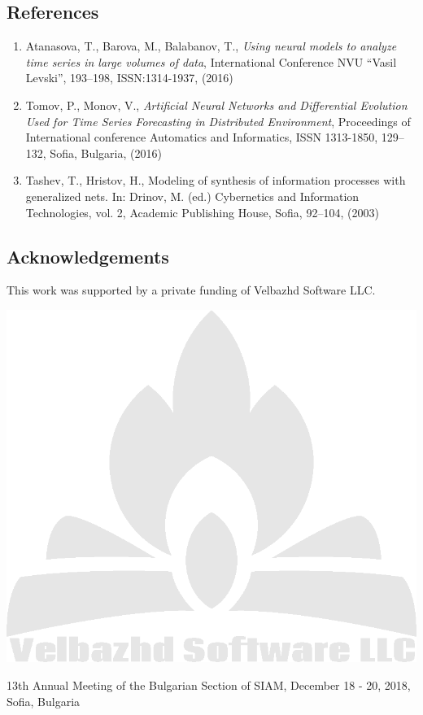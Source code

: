 \documentclass[a0,portrait,25pt]{sciposter}
\begin{document}
\begin{multicols}{3}
\begin{mdframed}[backgroundcolor=white,roundcorner=4pt,shadow=true,linewidth=1pt]
\color{Black}
\section*{References}
\begin{enumerate}
\item Atanasova, T., Barova, M., Balabanov, T., \textit{Using neural models to analyze time series in large volumes of data}, International Conference  NVU “Vasil Levski”, 193--198, ISSN:1314-1937, (2016) 
\item Tomov, P., Monov, V., \textit{Artificial Neural Networks and Differential Evolution Used for Time Series Forecasting in Distributed Environment}, Proceedings of International conference Automatics and Informatics, ISSN 1313-1850, 129--132, Sofia, Bulgaria, (2016) 
\item Tashev, T., Hristov, H., Modeling of synthesis of information processes with generalized nets. In: Drinov, M. (ed.) Cybernetics and Information Technologies, vol. 2, Academic Publishing House, Sofia, 92–104, (2003) 
\end{enumerate}
\end{mdframed}

\begin{mdframed}[backgroundcolor=white,roundcorner=4pt,shadow=true,linewidth=1pt]
\section*{Acknowledgements}
This work was supported by a private funding of Velbazhd Software LLC. 

\includegraphics[width=0.98\linewidth]{veld_soft_camp_fire_logo}
\end{mdframed}
\end{multicols}

\begin{mdframed}[backgroundcolor=white,roundcorner=4pt,shadow=true,linewidth=1pt]
\color{Black}
13th Annual Meeting of the Bulgarian Section of SIAM, December 18 - 20, 2018, Sofia, Bulgaria
\end{mdframed}
\end{document}
